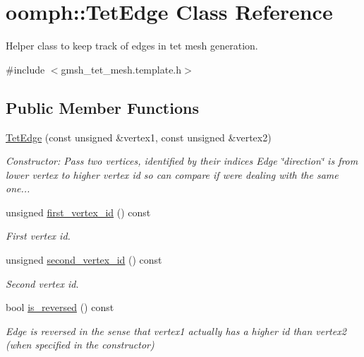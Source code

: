 \hypertarget{classoomph_1_1TetEdge}{}\section{oomph\+:\+:Tet\+Edge Class Reference}
\label{classoomph_1_1TetEdge}


Helper class to keep track of edges in tet mesh generation.  




{\ttfamily \#include $<$gmsh\+\_\+tet\+\_\+mesh.\+template.\+h$>$}

\subsection*{Public Member Functions}
\begin{DoxyCompactItemize}
\item 
\hyperlink{classoomph_1_1TetEdge_aa50127a0f255985cced5d90ec2325c0c}{Tet\+Edge} (const unsigned \&vertex1, const unsigned \&vertex2)
\begin{DoxyCompactList}\small\item\em Constructor\+: Pass two vertices, identified by their indices Edge \char`\"{}direction\char`\"{} is from lower vertex to higher vertex id so can compare if we\textquotesingle{}re dealing with the same one... \end{DoxyCompactList}\item 
unsigned \hyperlink{classoomph_1_1TetEdge_acc26fa59e15615e1620fade6f9d1bbe1}{first\+\_\+vertex\+\_\+id} () const
\begin{DoxyCompactList}\small\item\em First vertex id. \end{DoxyCompactList}\item 
unsigned \hyperlink{classoomph_1_1TetEdge_a5ab63d3dece25fd81b5dad00b7fc8b3f}{second\+\_\+vertex\+\_\+id} () const
\begin{DoxyCompactList}\small\item\em Second vertex id. \end{DoxyCompactList}\item 
bool \hyperlink{classoomph_1_1TetEdge_a9a124de5c191e1b0e43ed92c2a867c55}{is\+\_\+reversed} () const
\begin{DoxyCompactList}\small\item\em Edge is reversed in the sense that vertex1 actually has a higher id than vertex2 (when specified in the constructor) \end{DoxyCompactList}\item 

\end{DoxyCompactItemize}
